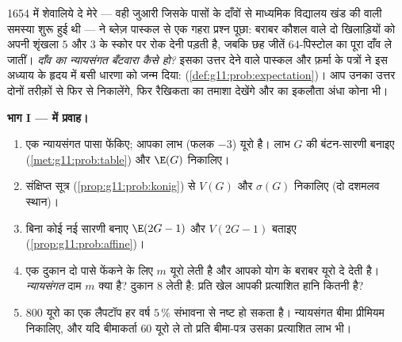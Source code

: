 \begin{problem}[{सप्ताहांत समस्या --- पास्कल, फ़र्मा और बीच में रुके दाँव का
न्यायसंगत बँटवारा: प्रत्याशा का जन्म, रैखिकता का जादू, और वह जो प्रत्याशा
नहीं देख पाती}]
\label{pb:g11:prob:1}
1654 में शेवालिये दे मेरे --- वही जुआरी जिसके पासों के दाँवों से माध्यमिक
विद्यालय खंड की  वाली समस्या शुरू हुई थी --- ने ब्लेज़ पास्कल से एक
गहरा प्रश्न पूछा: बराबर कौशल वाले दो खिलाड़ियों को अपनी शृंखला $5$ और $3$
के स्कोर पर रोक देनी पड़ती है, जबकि छह जीतें $64$-पिस्टोल का पूरा दाँव ले
जातीं। \emph{दाँव का न्यायसंगत बँटवारा कैसे हो?} इसका उत्तर देने वाले
पास्कल और फ़र्मा के पत्रों ने इस अध्याय के हृदय में बसी धारणा को जन्म दिया:
 (\cref{def:g11:prob:expectation})। आप उनका उत्तर दोनों तरीक़ों से फिर से निकालेंगे, फिर
रैखिकता का तमाशा देखेंगे और  का इकलौता अंधा कोना भी।

\medskip
\noindent\textbf{भाग I ---  में प्रवाह।}
\begin{enumerate}
  \item एक न्यायसंगत पासा फेंकिए; आपका लाभ (फलक $- 3$) यूरो है। लाभ $G$
        की बंटन-सारणी बनाइए (\cref{met:g11:prob:table}) और $\E(G)$ निकालिए।
  \item संक्षिप्त सूत्र (\cref{prop:g11:prob:konig}) से $V(G)$ और $\sigma(G)$ निकालिए (दो दशमलव स्थान)।
  \item बिना कोई नई सारणी बनाए $\E(2G - 1)$ और $V(2G - 1)$ बताइए (\cref{prop:g11:prob:affine})।
  \item एक दुकान दो पासे फेंकने के लिए $m$ यूरो लेती है और आपको योग के
        बराबर यूरो दे देती है। \emph{न्यायसंगत} दाम $m$ क्या है? दुकान
        $8$ लेती है: प्रति खेल आपकी प्रत्याशित हानि कितनी है?
  \item $800$ यूरो का एक लैपटॉप हर वर्ष $5\,\%$ संभावना से नष्ट हो सकता है।
        न्यायसंगत बीमा प्रीमियम निकालिए, और यदि बीमाकर्ता $60$ यूरो ले तो
        प्रति बीमा-पत्र उसका प्रत्याशित लाभ भी।
\end{enumerate}


\end{problem}
